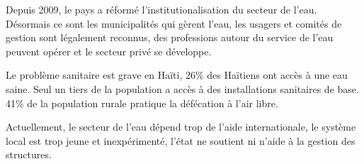 \documentclass[a4paper, 11pt]{article}
\begin{document}
  Depuis 2009, le pays a réformé l'institutionalisation du secteur de l'eau. Désormais ce sont les municipalités qui gèrent l'eau, les usagers et comités de gestion sont légalement reconnus, des professions autour du service de l'eau peuvent opérer et le secteur privé se développe.

  Le problème sanitaire est grave en Haïti, 26\% des Haïtiens ont accès à une eau saine. Seul un tiers de la population a accès à des installations sanitaires de base. 41\% de la population rurale pratique la défécation à l'air libre.

  Actuellement, le secteur de l'eau dépend trop de l'aide internationale, le système local est trop jeune et inexpérimenté, l'état ne soutient ni n'aide à la gestion des structures.

\end{document}
